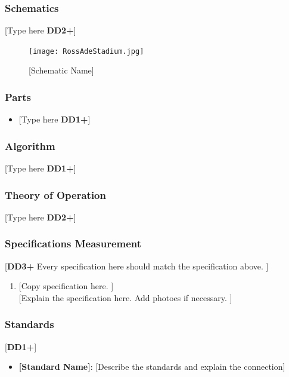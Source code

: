 \documentclass[letterpaper, 11pt]{article}
\begin{document}
\subsubsection{Schematics}
[Type here \textbf{DD2+}]
\begin{figure}[h]
    \centering
    \texttt{[image: RossAdeStadium.jpg]} %
    \caption{[Schematic Name]}
\end{figure} %

\subsubsection{Parts}
\begin{itemize}
    \item {[Type here \textbf{DD1+}]}
\end{itemize}

\subsubsection{Algorithm}
[Type here \textbf{DD1+}]

\subsubsection{Theory of Operation}
[Type here \textbf{DD2+}]

\subsubsection{Specifications Measurement}
[\textbf{DD3+} Every specification here should match the specification above. ]
\begin{enumerate}
    \item {[Copy specification here. ]} \\
          {[Explain the specification here. Add photoes if necessary. ]}
\end{enumerate}

\subsubsection{Standards}
[\textbf{DD1+}]
\begin{itemize}
    \item \textbf{[Standard Name]}: [Describe the standards and explain the connection]
\end{itemize}
\end{document}
